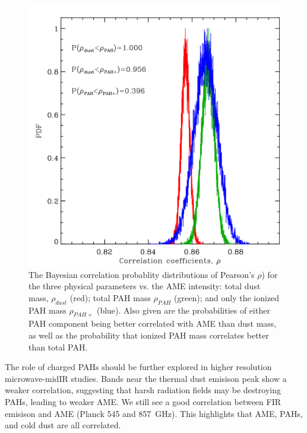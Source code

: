 \documentclass[12pt,a4paper]{article}
\begin{document}
  \begin{figure}[h]
    \includegraphics[width=\textwidth/2]{../Plots/ch_lori/fred_LOri_notes_Oct2017_fig2c.pdf}
    \centering
    \caption{\small The Bayesian correlation probablity distributions of Pearson's $\rho{}$) for the three physical parameters vs. the AME intensity: total dust mass, $\rho_{dust}$ (red); total PAH mass $\rho_{PAH}$ (green); and only the ionized PAH mass $\rho_{PAH+}$ (blue). 
    Also given are the probabilities of either PAH component being better correlated with AME than dust mass, as well as the probability that ionized PAH mass correlates better than total PAH.}
    \label{fig:fred_LOri_notes_Oct2017_fig2c}
  \end{figure}
The role of charged PAHs should be further explored in higher resolution microwave-midIR studies. 
Bands near the thermal dust emisison peak show a weaker correlation, suggesting that harsh radiation fields may be destroying PAHs, leading to weaker AME. 
We still see a good correlation between FIR emisison and AME (Planck 545 and 857~GHz). 
This highlights that AME, PAHs, and cold dust are all correlated.
\end{document}
